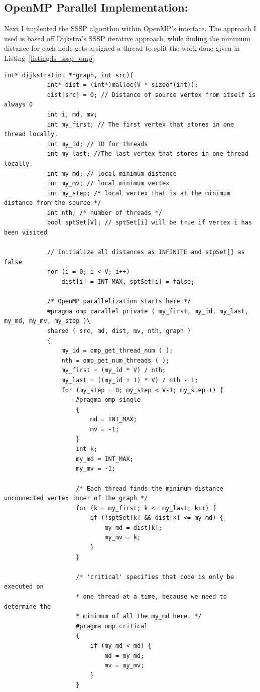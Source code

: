 	\subsection{OpenMP Parallel Implementation:}
	Next I implented the SSSP algorithm within OpenMP's interface. The approach I used is based off Dijkstra's SSSP iterative approach, while finding the minimum distance for each node gets assigned a thread to split the work done\cite{he2021parallelizing} given in Listing~\ref{listing:ls_sssp_omp}
	\begin{lstlisting}[caption={OpenMP Parallel algorithm for computing SSSP\cite{he2021parallelizing}}, label={listing:ls_sssp_omp}]
		int* dijkstra(int **graph, int src){
			int* dist = (int*)malloc(V * sizeof(int));
			dist[src] = 0; // Distance of source vertex from itself is always 0
			int i, md, mv;
			int my_first; // The first vertex that stores in one thread locally. 
			int my_id; // ID for threads
			int my_last; //The last vertex that stores in one thread locally. 
			int my_md; // local minimum distance
			int my_mv; // local minimum vertex
			int my_step; /* local vertex that is at the minimum distance from the source */
			int nth; /* number of threads */
			bool sptSet[V]; // sptSet[i] will be true if vertex i has been visited
			
			// Initialize all distances as INFINITE and stpSet[] as false
			for (i = 0; i < V; i++)
				dist[i] = INT_MAX, sptSet[i] = false;
			
			/* OpenMP parallelization starts here */
			#pragma omp parallel private ( my_first, my_id, my_last, my_md, my_mv, my_step )\
			shared ( src, md, dist, mv, nth, graph )
			{
				my_id = omp_get_thread_num ( );
				nth = omp_get_num_threads ( );
				my_first = (my_id * V) / nth;
				my_last = ((my_id + 1) * V) / nth - 1;
				for (my_step = 0; my_step < V-1; my_step++) {
					#pragma omp single
					{
						md = INT_MAX;
						mv = -1;
					}
					int k;
					my_md = INT_MAX;
					my_mv = -1;
					
					/* Each thread finds the minimum distance unconnected vertex inner of the graph */
					for (k = my_first; k <= my_last; k++) {
						if (!sptSet[k] && dist[k] <= my_md) {
							my_md = dist[k];
							my_mv = k;
						}
					}
					
					/* 'critical' specifies that code is only be executed on 
					* one thread at a time, because we need to determine the 
					* minimum of all the my_md here. */
					#pragma omp critical
					{
						if (my_md < md) {
							md = my_md;
							mv = my_mv;
						}
					}
					

\end{lstlisting}
